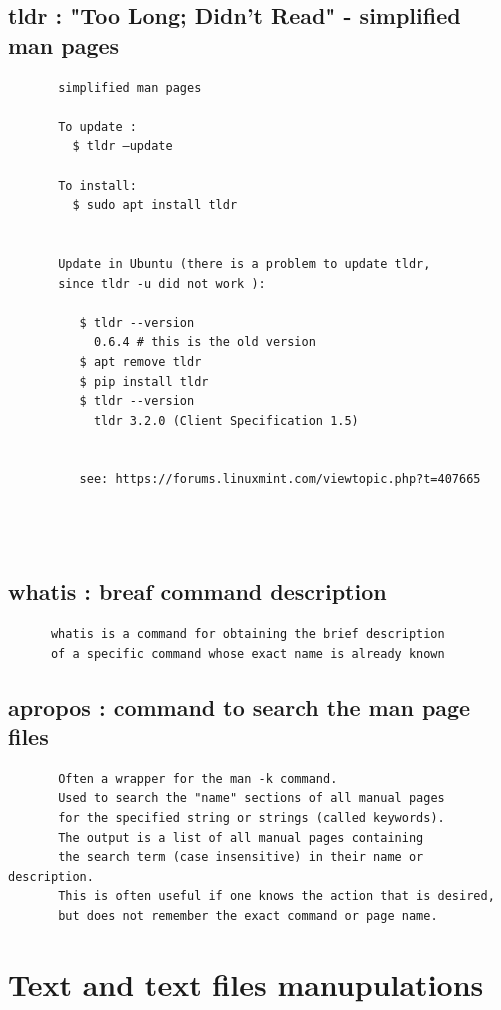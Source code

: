 \documentclass[a4paper,12pt]{article}
\begin{document}
\subsection{tldr     : "Too Long; Didn't Read" - simplified man pages}
\begin{verbatim}
       simplified man pages
     
       To update : 
         $ tldr –update

       To install:
         $ sudo apt install tldr
         
         
       Update in Ubuntu (there is a problem to update tldr,
       since tldr -u did not work ): 
         
          $ tldr --version
            0.6.4 # this is the old version
          $ apt remove tldr
          $ pip install tldr
          $ tldr --version
            tldr 3.2.0 (Client Specification 1.5)

             
          see: https://forums.linuxmint.com/viewtopic.php?t=407665
          
          
            
\end{verbatim}


\subsection{whatis   : breaf command description}
\begin{verbatim}
      whatis is a command for obtaining the brief description
      of a specific command whose exact name is already known
\end{verbatim}


\subsection{apropos  : command to search the man page files}
\begin{verbatim}
       Often a wrapper for the man -k command.  
       Used to search the "name" sections of all manual pages
       for the specified string or strings (called keywords).
       The output is a list of all manual pages containing
       the search term (case insensitive) in their name or description.
       This is often useful if one knows the action that is desired,
       but does not remember the exact command or page name.
\end{verbatim}


\section{Text and text files manupulations}
\end{document}
